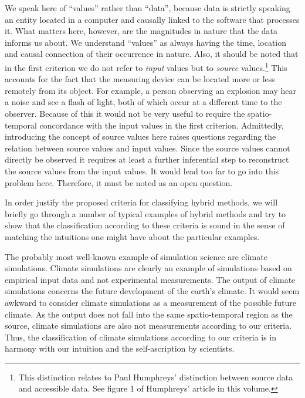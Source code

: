 \documentclass[12pt, a4paper]{article}
\numberwithin{equation}{section}
\begin{document}
We speak here of ``values'' rather than ``data'', because data is strictly speaking an entity located in a computer and causally linked to the software that processes it. What matters here, however, are the magnitudes in nature that the data informs us about. We understand ``values'' as always having the time, location and causal connection of their occurrence in nature. Also, it should be noted that in the first criterion we do not refer to {\em input} values but to {\em source} values.\footnote{This distinction relates to Paul Humphreys' distinction between source data and accessible data. See figure 1 of Humphreys' article in this volume.} This accounts for the fact that the measuring device can be located more or less remotely from its object. For example, a person observing an explosion may hear a noise and see a flash of light, both of which occur at a different time to the observer. Because of this it would not be very useful to require the spatio-temporal concordance with the input values in the first criterion. Admittedly, introducing the concept of source values here raises questions regarding the relation between source values and input values. Since the source values cannot directly be observed it requires at least a further inferential step to reconstruct the source values from the input values. It would lead too far to go into this problem here. Therefore, it must be noted as an open question.

In order justify the proposed criteria for classifying hybrid methods, we will briefly go through a number of typical examples of hybrid methods and try to show that the classification according to these criteria is sound in the sense of matching the intuitions one might have about the particular examples.

The probably most well-known example of simulation science are climate simulations. Climate simulations are clearly an example of simulations based on empirical input data and not experimental measurements. The output of climate simulations concerns the future development of the earth's climate. It would seem awkward to consider climate simulations as a measurement of the possible future climate. As the output does not fall into the same spatio-temporal region as the source, climate simulations are also not measurements according to our criteria. Thus, the classification of climate simulations according to our criteria is in harmony with our intuition and the self-ascription by scientists.
\end{document}
